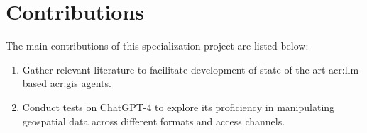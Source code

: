 \section{Contributions}
\label{sec:introContributions}

The main contributions of this specialization project are listed below:
\begin{enumerate}
    \item Gather relevant literature to facilitate development of state-of-the-art \acrshort{acr:llm}-based \acrshort{acr:gis} agents.
    \item Conduct tests on ChatGPT-4 to explore its proficiency in manipulating geospatial data across different formats and access channels.
\end{enumerate}

